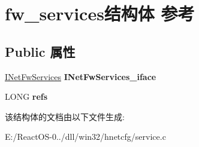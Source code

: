 \hypertarget{structfw__services}{}\section{fw\+\_\+services结构体 参考}
\label{structfw__services}
\subsection*{Public 属性}
\begin{DoxyCompactItemize}
\item 
\mbox{\label{structfw__services_ad0b1578ef068610e60086007cefd6d97}} 
\hyperlink{interface_i_net_fw_services}{I\+Net\+Fw\+Services} {\bfseries I\+Net\+Fw\+Services\+\_\+iface}
\item 
\mbox{\label{structfw__services_ae0dd301d64b37e03375ef2cf8917f415}} 
L\+O\+NG {\bfseries refs}
\end{DoxyCompactItemize}


该结构体的文档由以下文件生成\+:\begin{DoxyCompactItemize}
\item 
E\+:/\+React\+O\+S-\/0../dll/win32/hnetcfg/service.\+c\end{DoxyCompactItemize}
